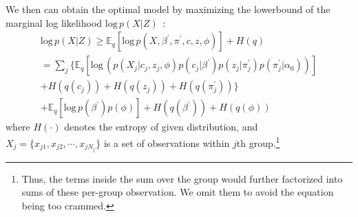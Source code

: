 \documentclass{article}
\begin{document}
We then can obtain the optimal model by maximizing the lowerbound of the marginal log likelihood $\text{log}\,p(X|Z)$~\cite{DBLP:journals/jei/BishopN07, DBLP:journals/ml/JordanGJS99, 10.1214/06-BA104}:
\begin{equation}\label{eq:lowerbound}
\begin{aligned}
    \text{log}\, p(X|Z) \geq \mathbb{E}_{q}[\text{log}\,p(X, \beta^{\prime}, \pi^{\prime}, c, z, \phi)] + H(q) \\
    = \textstyle \sum_{j} \big\{ \mathbb{E}_{q}[\text{log}\,(p(X_{j}|c_{j}, z_{j}, \phi)p(c_{j}|\beta^{\prime})p(z_{j}|\pi_{j}^{\prime})p(\pi^{\prime}_{j}|\alpha_{0}))] \\
    + H(q(c_{j})) + H(q(z_{j})) + H(q(\pi^{\prime}_{j})) \big\} \\
    + \mathbb{E}_{q}[\text{log}\,p(\beta^{\prime})p(\phi)] + H(q(\beta^{\prime})) + H(q(\phi))
\end{aligned}
\end{equation}
where $H(\cdot)$ denotes the entropy of given distribution, and $X_{j} = \{x_{j1}, x_{j2}, \cdots, x_{jN_{j}}\}$ is a set of observations within $j$th group.\footnote{Thus, the terms inside the sum over the group would further factorized into sums of these per-group observation. We omit them to avoid the equation being too crammed.}
\end{document}
